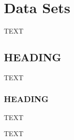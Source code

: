 \documentclass[journal abbreviation, manuscript]{copernicus}
\begin{document}
\section{Data Sets}
TEXT


\subsection{HEADING}
TEXT


\subsubsection{HEADING}
TEXT


\conclusions  %
TEXT











\appendix
\section{}    %

\subsection{}     %


\noappendix       %


\end{document}
